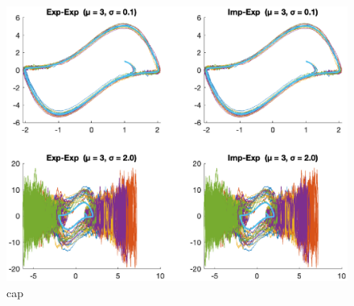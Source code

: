 \begin{figure}
    \centering
    \includegraphics[width=\textwidth]{plots/4d.eps}
    \caption{cap}
    \label{fig:4a}
\end{figure}

